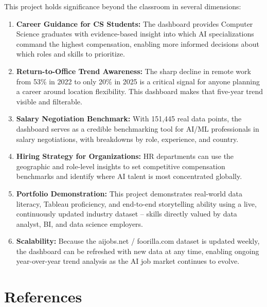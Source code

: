 \documentclass[12pt,a4paper]{article}
\begin{document}
This project holds significance beyond the classroom in several dimensions:

\begin{enumerate}[leftmargin=2em, itemsep=6pt]

  \item \textbf{Career Guidance for CS Students:} The dashboard provides Computer
        Science graduates with evidence-based insight into which AI specializations
        command the highest compensation, enabling more informed decisions about
        which roles and skills to prioritize.

  \item \textbf{Return-to-Office Trend Awareness:} The sharp decline in remote work
        from 53\% in 2022 to only 20\% in 2025 is a critical signal for anyone
        planning a career around location flexibility. This dashboard makes that
        five-year trend visible and filterable.

  \item \textbf{Salary Negotiation Benchmark:} With 151{,}445 real data points, the
        dashboard serves as a credible benchmarking tool for AI/ML professionals in
        salary negotiations, with breakdowns by role, experience, and country.

  \item \textbf{Hiring Strategy for Organizations:} HR departments can use the
        geographic and role-level insights to set competitive compensation benchmarks
        and identify where AI talent is most concentrated globally.

  \item \textbf{Portfolio Demonstration:} This project demonstrates real-world data
        literacy, Tableau proficiency, and end-to-end storytelling ability using a
        live, continuously updated industry dataset -- skills directly valued by data
        analyst, BI, and data science employers.

  \item \textbf{Scalability:} Because the aijobs.net / foorilla.com dataset is updated
        weekly, the dashboard can be refreshed with new data at any time, enabling
        ongoing year-over-year trend analysis as the AI job market continues to evolve.

\end{enumerate}

\section{References}
\end{document}
